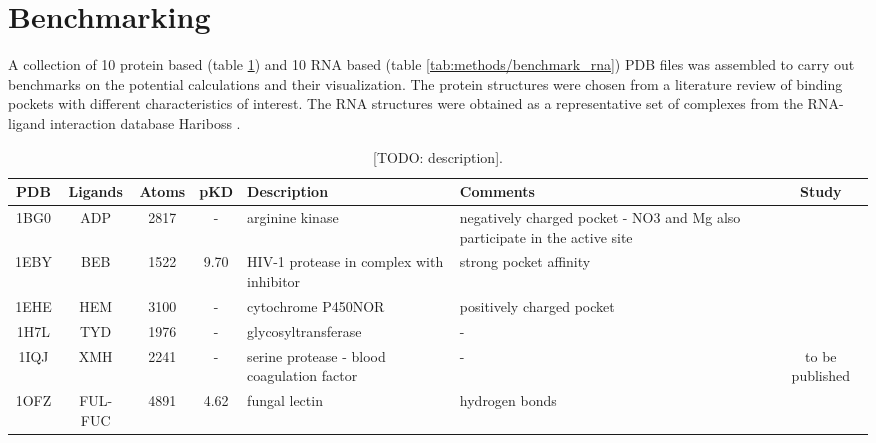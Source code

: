 \section{Benchmarking}
  A collection of 10 protein based (table \ref{tab:methods/benchmark_prot}) and 10 RNA based (table \ref{tab:methods/benchmark_rna}) PDB files was assembled to carry out benchmarks on the potential calculations and their visualization. The protein structures were chosen from a literature review of binding pockets with different characteristics of interest. The RNA structures were obtained as a representative set of complexes from the RNA-ligand interaction database Hariboss \cite{hariboss_2022}.

  \begin{table}[H]
    \caption{\label{tab:methods/benchmark_prot} [TODO: description].}
    \centering
    \begin{tabular}{ccccp{1.5in}p{1.5in}c}
      \hline
      PDB  & Ligands & Atoms & pKD   & Description                                & Comments                                                                   & Study                            \\ \hline
      1BG0 & ADP     & 2817  & -     & arginine kinase                            & negatively charged pocket - NO3 and Mg also participate in the active site & \cite{benchmark_negative_2000}    \\ \hline
      1EBY & BEB     & 1522  & 9.70  & HIV-1 protease in complex with inhibitor   & strong pocket affinity                                                     & \cite{benchmark_strong_2021}      \\ \hline
      1EHE & HEM     & 3100  & -     & cytochrome P450NOR                         & positively charged pocket                                                  & \cite{benchmark_positive_2001}    \\ \hline
      1H7L & TYD     & 1976  & -     & glycosyltransferase                        & -                                                                          & \cite{benchmark_1h7l_2001}        \\ \hline
      1IQJ & XMH     & 2241  & -     & serine protease - blood coagulation factor & -                                                                          & to be published                   \\ \hline
      1OFZ & FUL-FUC & 4891  & 4.62  & fungal lectin                              & hydrogen bonds                                                             & \cite{hbonds_2023}                \\ \hline

\end{tabular}
\end{table}
